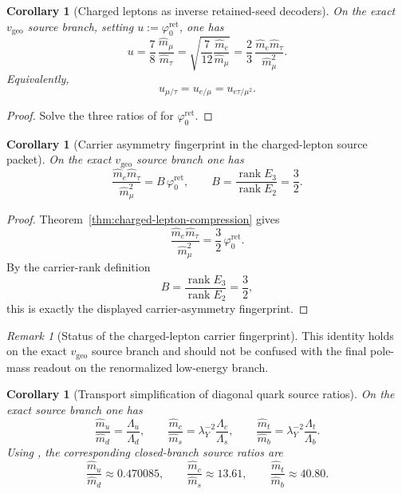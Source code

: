 \documentclass[11pt,a4paper]{article}
\newtheorem{corollary}[theorem]{Corollary}
\theoremstyle{definition}
\theoremstyle{remark}
\newtheorem*{remark}{Remark}
\DeclareMathOperator{\rank}{rank}
\newcommand{\phiz}{\varphi_0^{\mathrm{ret}}}
\newcommand{\lambdaY}{\lambda_Y}
\newcommand{\vgeo}{v_{\mathrm{geo}}}
\begin{document}
\begin{corollary}[Charged leptons as inverse retained-seed decoders]
\label{cor:charged-lepton-seed-decoder}
On the exact $\vgeo$ source branch, setting $u:=\phiz$, one has
\[
u
=
\frac78\,\frac{\hat m_\mu}{\hat m_\tau}
=
\sqrt{\frac7{12}\frac{\hat m_e}{\hat m_\mu}}
=
\frac23\,\frac{\hat m_e\hat m_\tau}{\hat m_\mu^2}.
\]
Equivalently,
\[
u_{\mu/\tau}=u_{e/\mu}=u_{e\tau/\mu^2}.
\]
\end{corollary}

\begin{proof}
Solve the three ratios of  for $\phiz$.
\end{proof}

\begin{corollary}[Carrier asymmetry fingerprint in the charged-lepton source packet]
\label{cor:carrier-asymmetry-leptons}
On the exact $\vgeo$ source branch one has
\[
\frac{\hat m_e \hat m_\tau}{\hat m_\mu^2}=B\,\phiz,
\qquad
B=\frac{\rank E_3}{\rank E_2}=\frac32.
\]
\end{corollary}

\begin{proof}
Theorem~\ref{thm:charged-lepton-compression} gives
\[
\frac{\hat m_e \hat m_\tau}{\hat m_\mu^2}=\frac32\,\phiz.
\]
By the carrier-rank definition
\[
B=\frac{\rank E_3}{\rank E_2}=\frac32,
\]
this is exactly the displayed carrier-asymmetry fingerprint.
\end{proof}

\begin{remark}[Status of the charged-lepton carrier fingerprint]
This identity holds on the exact $\vgeo$ source branch and should not be confused with the final
pole-mass readout on the renormalized low-energy branch.
\end{remark}

\begin{corollary}[Transport simplification of diagonal quark source ratios]
\label{cor:quark-source-ratios}
On the exact source branch one has
\[
\frac{\hat m_u}{\hat m_d}=\frac{\Lambda_u}{\Lambda_d},
\qquad
\frac{\hat m_c}{\hat m_s}=\lambdaY^{-2}\frac{\Lambda_c}{\Lambda_s},
\qquad
\frac{\hat m_t}{\hat m_b}=\lambdaY^{-2}\frac{\Lambda_t}{\Lambda_b}.
\]
Using , the corresponding closed-branch source ratios are
\[
\frac{\hat m_u}{\hat m_d}\approx\num{0.470085},
\qquad
\frac{\hat m_c}{\hat m_s}\approx\num{13.61},
\qquad
\frac{\hat m_t}{\hat m_b}\approx\num{40.80}.
\]
\end{corollary}
\end{document}
